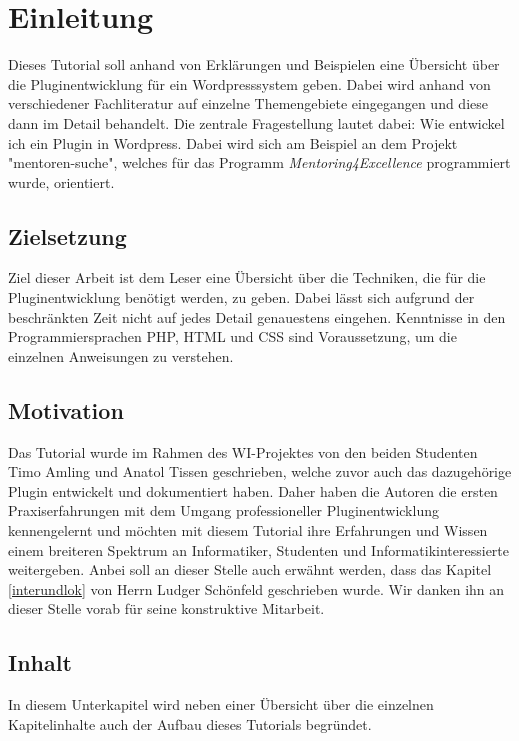 \section{Einleitung}\label{sec_Einleitung}
Dieses Tutorial soll anhand von Erklärungen und Beispielen eine Übersicht über die Pluginentwicklung für ein Wordpresssystem geben. \newline
Dabei wird anhand von verschiedener Fachliteratur auf einzelne Themengebiete eingegangen und diese dann im Detail behandelt. \newline
Die zentrale Fragestellung lautet dabei: Wie entwickel ich ein Plugin in Wordpress. Dabei wird  sich am Beispiel an dem Projekt "mentoren-suche", welches für das Programm \emph{Mentoring4Excellence} programmiert wurde, orientiert.
\subsection{Zielsetzung}
Ziel dieser Arbeit ist dem Leser eine Übersicht über die Techniken, die für die Pluginentwicklung benötigt werden, zu geben.\newline
Dabei lässt sich aufgrund der beschränkten Zeit nicht auf jedes Detail genauestens eingehen. Kenntnisse in den Programmiersprachen PHP, HTML und CSS sind Voraussetzung, um die einzelnen Anweisungen zu verstehen. 
\subsection{Motivation}
Das Tutorial wurde im Rahmen des WI-Projektes von den beiden Studenten Timo Amling und Anatol Tissen geschrieben, welche zuvor auch das dazugehörige Plugin entwickelt und dokumentiert haben.\newline
Daher haben die Autoren die ersten Praxiserfahrungen mit dem Umgang professioneller Pluginentwicklung kennengelernt und möchten mit diesem Tutorial ihre Erfahrungen und Wissen einem breiteren Spektrum an Informatiker, Studenten und Informatikinteressierte weitergeben.\newline
Anbei soll an dieser Stelle auch erwähnt werden, dass das Kapitel \ref{interundlok} von Herrn Ludger Schönfeld geschrieben wurde. Wir danken ihn an dieser Stelle vorab für seine konstruktive Mitarbeit.
\subsection{Inhalt}
In diesem Unterkapitel wird neben einer Übersicht über die einzelnen Kapitelinhalte auch der Aufbau dieses Tutorials begründet. 
